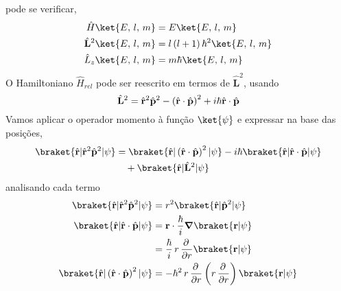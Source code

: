 \documentclass[12pt,brazil,table]{beamer}
\begin{document}
\begin{frame}
\begin{columns}[T]
  pode se verificar,\vspace*{-0.35cm}
  \[
    \begin{align*}
      \hat{H}\ket{E,\,l,\, m} &= E\ket{E,\,l,\, m}\\
      \hat{\mathbf{L}}^2\ket{E,\,l,\, m} &= l\left(l+1\right)\hbar^2\ket{E,\,l,\, m}\\
      \hat{L}_z\ket{E,\,l,\, m} &= m\hbar \ket{E,\,l,\, m}
    \end{align*}\vspace*{-0.25cm}
  \]
  O Hamiltoniano $\hat{H}_{rel}$ pode ser reescrito em termos de $\hat{\mathbf{L}}^2$, usando\vspace*{-0.35cm}
  \[
    \hat{\mathbf{L}}^2 = \hat{\mathbf{r}}^2\hat{\mathbf{p}}^2 - \left( \hat{\mathbf{r}} \cdot \hat{\mathbf{p}} \right)^2 + i\hbar \hat{\mathbf{r}} \cdot \hat{\mathbf{p}}\vspace*{-0.25cm}
  \]
  Vamos aplicar o operador momento à função $\ket{\psi}$ e expressar na base das posições,\vspace*{-0.35cm}
  \[
    \begin{align*}
      \braket{\hat{\mathbf{r}}|\hat{\mathbf{r}}^2\hat{\mathbf{p}}^2|\psi} &= \braket{\hat{\mathbf{r}}|\left( \hat{\mathbf{r}} \cdot \hat{\mathbf{p}} \right)^2|\psi} -i\hbar \braket{\hat{\mathbf{r}}|\hat{\mathbf{r}} \cdot \hat{\mathbf{p}}|\psi}\\
      &\quad+ \braket{\hat{\mathbf{r}}|\hat{\mathbf{L}}^2|\psi}
    \end{align*}\vspace*{-0.25cm}
  \]
  analisando cada termo\vspace*{-0.25cm}
  \[
    \begin{align*}
      \braket{\hat{\mathbf{r}}|\hat{\mathbf{r}}^2\hat{\mathbf{p}}^2|\psi} &= r^2\braket{\hat{\mathbf{r}}|\hat{\mathbf{p}}^2|\psi}\\
      \braket{\hat{\mathbf{r}}|\hat{\mathbf{r}} \cdot \hat{\mathbf{p}}|\psi} &=\mathbf{r} \cdot \dfrac{\hbar}{i}\boldsymbol{\nabla}\braket{\mathbf{r}|\psi}\\
      &=\dfrac{\hbar}{i} \,r\, \dfrac{\partial\,}{\partial r}\braket{\mathbf{r}|\psi}\\
      \braket{\hat{\mathbf{r}}|\left( \hat{\mathbf{r}} \cdot \hat{\mathbf{p}} \right)^2|\psi} &= -\hbar^2\,r\, \dfrac{\partial\,}{\partial r}\left(r\, \dfrac{\partial\,}{\partial r}\right)\braket{\mathbf{r}|\psi}
    \end{align*}\vspace*{-0.25cm}
  \]

  \end{columns}

\end{frame}
\end{document}
